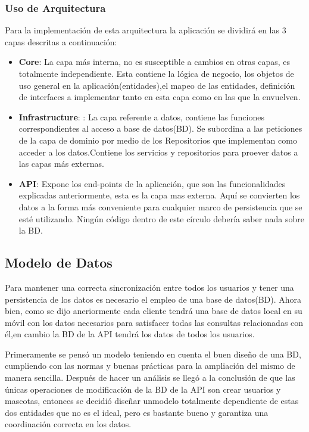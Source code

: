 \subsubsection{Uso de Arquitectura}
Para la implementación de esta arquitectura la aplicación se dividirá en las 3 capas descritas a continuación:

\begin{itemize}
	\item \textbf{Core}: La capa más interna, no es susceptible a cambios en otras capas, es totalmente independiente. Esta contiene la lógica de negocio, los objetos de uso general en la aplicación(entidades),el mapeo de las entidades, definición de interfaces a implementar tanto en esta capa como en las que la envuelven.
	
	\item \textbf{Infrastructure}: : La capa referente a datos, contiene las funciones correspondientes al acceso a base de datos(BD). Se subordina a las peticiones de la capa de dominio por medio de los
	Repositorios que implementan como acceder a los datos.Contiene los servicios y repositorios para proever datos a las capas más externas.
	
	\item \textbf{API}: Expone los end-points de la aplicación, que son las funcionalidades explicadas anteriormente, esta es la capa mas externa. Aquí se convierten los datos  a la forma más conveniente para cualquier marco de persistencia que se esté utilizando. Ningún código dentro de este círculo debería saber nada sobre la BD.
	
\end{itemize}


\subsection{Modelo de Datos }

Para mantener una correcta sincronización entre todos los usuarios y tener una persistencia de  los datos es necesario el empleo de una base de datos(BD). Ahora bien, como se dijo aneriormente cada cliente tendrá una base de datos local en su móvil con los datos necesarios para satisfacer todas las consultas relacionadas con él,en cambio la BD de la API tendrá los datos de todos los usuarios. 

Primeramente se pensó un modelo teniendo en cuenta el buen diseño de una BD, cumpliendo con las normas y buenas prácticas para la ampliación del mismo de manera sencilla. Después de hacer un análisis se llegó a la conclusión de que las únicas operaciones de modificación de la BD de la API son crear  usuarios y mascotas, entonces se decidió diseñar unmodelo totalmente dependiente de estas dos entidades que no es el ideal, pero es bastante bueno y garantiza una coordinación correcta en los datos. 

